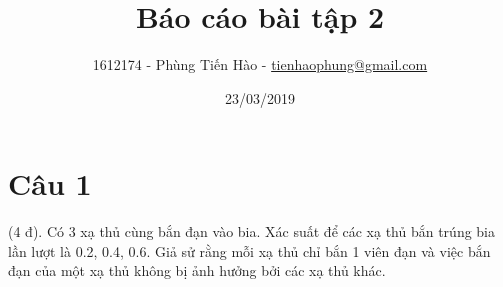 \documentclass[a4paper,12pt]{article}
\title{Báo cáo bài tập 2}
\author{1612174 - Phùng Tiến Hào - \href{mailto:tienhaophung@gmail.com}{tienhaophung@gmail.com}}
\date{23/03/2019}
\begin{document}
\maketitle
\newpage

\doublespacing
\tableofcontents
\singlespace

\newpage
{}

\section{Câu 1}
(4 đ). Có 3 xạ thủ cùng bắn đạn vào bia. Xác suất để các xạ thủ bắn trúng bia lần lượt là
0.2, 0.4, 0.6. Giả sử rằng mỗi xạ thủ chỉ bắn 1 viên đạn và việc bắn đạn của một xạ thủ không bị
ảnh hưởng bởi các xạ thủ khác.\\
\end{document}
